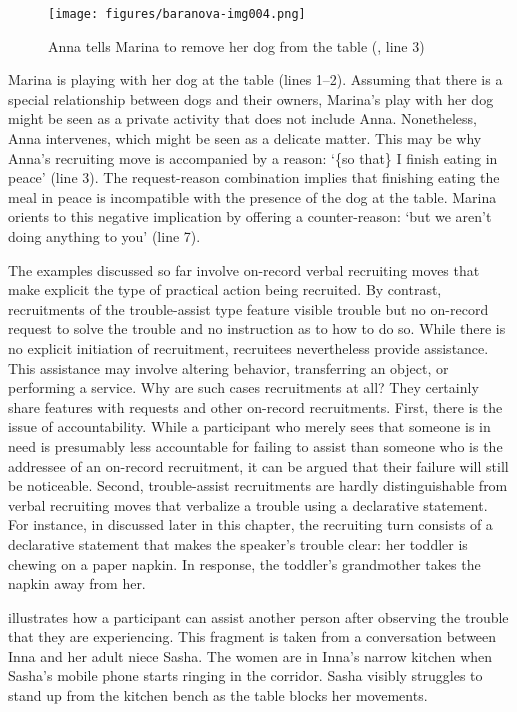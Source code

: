 \documentclass[output=paper,modfonts,nonflat]{langsci/langscibook}
\begin{document}
\begin{figure}
\caption{Anna tells Marina to remove her dog from the table (, line 3)}
\label{fig:baranova:4}
\texttt{[image: figures/baranova-img004.png]}
\end{figure}

Marina is playing with her dog at the table (lines 1--2). Assuming that there is a special relationship between dogs and their owners, Marina’s play with her dog might be seen as a private activity that does not include Anna. Nonetheless, Anna intervenes, which might be seen as a delicate matter. This may be why Anna’s recruiting move is accompanied by a reason: ‘\{so that\} I finish eating in peace’ (line 3). The request-reason combination implies that finishing eating the meal in peace is incompatible with the presence of the dog at the table. Marina orients to this negative implication by offering a counter-reason: ‘but we aren’t doing anything to you’ (line 7).

The examples discussed so far involve on-record verbal recruiting moves that make explicit the type of practical action being recruited. By contrast, recruitments of the trouble-assist type feature visible trouble but no on-record request to solve the trouble and no instruction as to how to do so. While there is no explicit initiation of recruitment, recruitees nevertheless provide assistance. This assistance may involve altering behavior, transferring an object, or performing a service. Why are such cases recruitments at all? They certainly share features with requests and other on-record recruitments. First, there is the issue of accountability. While a participant who merely sees that someone is in need is presumably less accountable for failing to assist than someone who is the addressee of an on-record recruitment, it can be argued that their failure will still be noticeable. Second, trouble-assist recruitments are hardly distinguishable from verbal recruiting moves that verbalize a trouble using a declarative statement. For instance, in  discussed later in this chapter, the recruiting turn consists of a declarative statement that makes the speaker's trouble clear: her toddler is chewing on a paper napkin. In response, the toddler’s grandmother takes the napkin away from her.

 illustrates how a participant can assist another person after observing the trouble that they are experiencing. This fragment is taken from a conversation between Inna and her adult niece Sasha. The women are in Inna's narrow kitchen when Sasha’s mobile phone starts ringing in the corridor. Sasha visibly struggles to stand up from the kitchen bench as the table blocks her movements.
\end{document}
